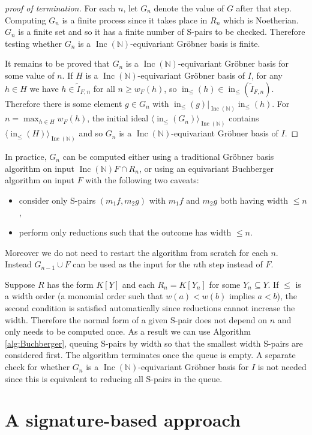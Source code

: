 \documentclass{amsart}
\theoremstyle{definition}
\theoremstyle{remark}
\numberwithin{equation}{section}
\newcommand{\B}[1]{\mathbb #1}
\newcommand{\ideal}[1]{\langle #1 \rangle}
\DeclareMathOperator{\initial}{in}
\newcommand{\Inc}{\operatorname{Inc}(\B N)}
\newcommand{\LT}{\initial_{\leq}}
\begin{document}
\begin{proof}[proof of termination]
For each $n$, let $G_n$ denote the value of $G$ after that step.  Computing $G_n$ is a finite process since it takes place in $R_n$ which is Noetherian.  $G_n$ is a finite set and so it has a finite number of S-pairs to be checked.  Therefore testing whether $G_n$ is a $\Inc$-equivariant Gr\"obner basis is finite.

It remains to be proved that $G_n$ is a $\Inc$-equivariant Gr\"obner basis for some value of $n$.  If $H$ is a $\Inc$-equivariant Gr\"obner basis of $I$, for any $h \in H$ we have $h \in \tilde{I}_{F,n}$ for all $n \geq w_F(h)$, so $\LT(h) \in \LT(\tilde{I}_{F,n})$.  Therefore there is some element $g \in G_n$ with $\LT(g)|_{\Inc} \LT(h)$.  For $n = \max_{h\in H} w_F(h)$, the initial ideal $\ideal{\LT(G_n)}_{\Inc}$ contains $\ideal{\LT(H)}_{\Inc}$ and so $G_n$ is a $\Inc$-equivariant Gr\"obner basis of $I$.
\end{proof}

In practice, $G_n$ can be computed either using a traditional Gr\"obner basis algorithm on input $\Inc F \cap R_n$, or using an equivariant Buchberger algorithm on input $F$ with the following two caveats:
\begin{itemize}
 \item consider only S-pairs $(m_1f, m_2g)$ with $m_1f$ and $m_2g$ both having width $\leq n$,
 \item perform only reductions such that the outcome has width $\leq n$.
\end{itemize}
Moreover we do not need to restart the algorithm from scratch for each $n$.  Instead $G_{n-1} \cup F$ can be used as the input for the $n$th step instead of $F$.

Suppose $R$ has the form $K[Y]$ and each $R_n = K[Y_n]$ for some $Y_n \subseteq Y$.  If $\leq$ is a width order (a monomial order such that $w(a) < w(b)$ implies $a < b$), the second condition is satisfied automatically since reductions cannot increase the width.  Therefore the normal form of a given S-pair does not depend on $n$ and only needs to be computed once.  As a result we can use Algorithm \ref{alg:Buchberger}, queuing S-pairs by width so that the smallest width S-pairs are considered first.  The algorithm terminates once the queue is empty.  A separate check for whether $G_n$ is a $\Inc$-equivariant Gr\"obner basis for $I$ is not needed since this is equivalent to reducing all S-pairs in the queue.

\section{A signature-based approach}
\end{document}
